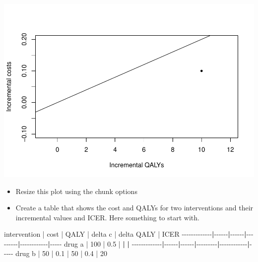 \documentclass[
]{article}
\newenvironment{Shaded}{\begin{snugshade}}{\end{snugshade}}
\newcommand{\DecValTok}[1]{\textcolor[rgb]{0.00,0.00,0.81}{#1}}
\newcommand{\ErrorTok}[1]{\textcolor[rgb]{0.64,0.00,0.00}{\textbf{#1}}}
\newcommand{\FloatTok}[1]{\textcolor[rgb]{0.00,0.00,0.81}{#1}}
\newcommand{\NormalTok}[1]{#1}
\newcommand{\SpecialCharTok}[1]{\textcolor[rgb]{0.00,0.00,0.00}{#1}}
\begin{document}
\includegraphics{literate-programming-exercises_files/figure-latex/ceplane-1.pdf}

\begin{itemize}
\item
  Resize this plot using the chunk options
\item
  Create a table that shows the cost and QALYs for two interventions and
  their incremental values and ICER. Here something to start with.
\end{itemize}

\begin{Shaded}
\begin{Highlighting}[]
\NormalTok{intervention }\SpecialCharTok{|}\NormalTok{ cost }\SpecialCharTok{|}\NormalTok{ QALY }\SpecialCharTok{|}\NormalTok{ delta c }\SpecialCharTok{|}\NormalTok{ delta QALY }\SpecialCharTok{|}\NormalTok{ ICER}
\SpecialCharTok{{-}{-}{-}{-}{-}{-}{-}{-}{-}{-}{-}{-}{-}}\ErrorTok{|}\SpecialCharTok{{-}{-}{-}{-}{-}{-}}\ErrorTok{|}\SpecialCharTok{{-}{-}{-}{-}{-}{-}}\ErrorTok{|}\SpecialCharTok{{-}{-}{-}{-}{-}{-}{-}{-}{-}}\ErrorTok{|}\SpecialCharTok{{-}{-}{-}{-}{-}{-}{-}{-}{-}{-}{-}{-}}\ErrorTok{|}\SpecialCharTok{{-}{-}{-}{-}{-}}
\NormalTok{drug a       }\SpecialCharTok{|} \DecValTok{100}  \SpecialCharTok{|} \FloatTok{0.5}  \SpecialCharTok{|}         \ErrorTok{|}            \ErrorTok{|}
\SpecialCharTok{{-}{-}{-}{-}{-}{-}{-}{-}{-}{-}{-}{-}{-}}\ErrorTok{|}\SpecialCharTok{{-}{-}{-}{-}{-}{-}}\ErrorTok{|}\SpecialCharTok{{-}{-}{-}{-}{-}{-}}\ErrorTok{|}\SpecialCharTok{{-}{-}{-}{-}{-}{-}{-}{-}{-}}\ErrorTok{|}\SpecialCharTok{{-}{-}{-}{-}{-}{-}{-}{-}{-}{-}{-}{-}}\ErrorTok{|}\SpecialCharTok{{-}{-}{-}{-}{-}}
\NormalTok{drug b       }\SpecialCharTok{|} \DecValTok{50}   \SpecialCharTok{|} \FloatTok{0.1}  \SpecialCharTok{|}  \DecValTok{50}     \SpecialCharTok{|}  \FloatTok{0.4}       \SpecialCharTok{|} \DecValTok{20}
\end{Highlighting}
\end{Shaded}
\end{document}

